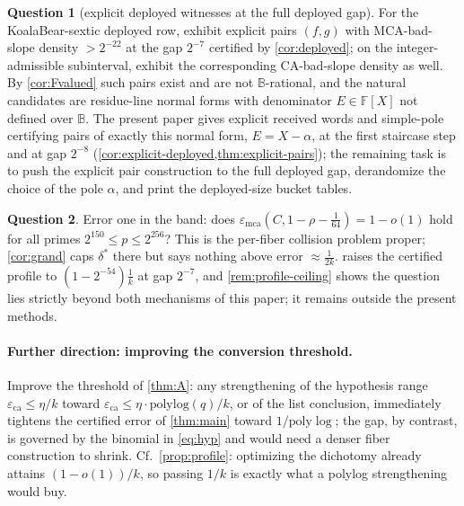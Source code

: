 \documentclass[11pt]{article}
\theoremstyle{definition}
\newtheorem{researchquestion}[researchquestion]{Question}
\theoremstyle{remark}
\newcommand{\F}{\mathbb{F}}
\newcommand{\B}{\mathbb{B}}
\newcommand{\eca}{\varepsilon_{\mathrm{ca}}}
\newcommand{\emca}{\varepsilon_{\mathrm{mca}}}
\begin{document}
\begin{researchquestion}[explicit deployed witnesses at the full deployed gap]\label{prob:explicit}
For the KoalaBear-sextic deployed row, exhibit explicit pairs $(f,g)$ with MCA-bad-slope density $>2^{-22}$ at the gap $2^{-7}$ certified by \cref{cor:deployed}; on the integer-admissible subinterval, exhibit the corresponding CA-bad-slope density as well.  By \cref{cor:Fvalued} such pairs exist and are not $\B$-rational, and the natural candidates are residue-line normal forms with denominator $E\in\F[X]$ not defined over $\B$.  The present paper gives explicit received words and simple-pole certifying pairs of exactly this normal form, $E=X-\alpha$, at the first staircase step and at gap $2^{-8}$ \textup(\cref{cor:explicit-deployed,thm:explicit-pairs}\textup); the remaining task is to push the explicit pair construction to the full deployed gap, derandomize the choice of the pole $\alpha$, and print the deployed-size bucket tables.
\end{researchquestion}

\begin{researchquestion}\label{prob:errorone}
Error one in the band: does $\emca(C,1-\rho-\frac1{64})=1-o(1)$ hold for all primes $2^{150}\le p\le2^{256}$? This is the per-fiber collision problem proper; \cref{cor:grand} caps $\delta^*$ there but says nothing above error $\approx\frac1{2k}$.   raises the certified profile to $(1-2^{-54})\frac1k$ at gap $2^{-7}$, and \cref{rem:profile-ceiling} shows the question lies strictly beyond both mechanisms of this paper; it remains outside the present methods.
\end{researchquestion}

\paragraph{Further direction: improving the conversion threshold.}\label{ques:conversion-threshold}
Improve the threshold of \cref{thm:A}: any strengthening of the hypothesis range $\eca\le\eta/k$ toward $\eca\le\eta\cdot\mathrm{polylog}(q)/k$, or of the list conclusion, immediately tightens the certified error of \cref{thm:main} toward $1/\mathrm{poly}\log$; the gap, by contrast, is governed by the binomial in \eqref{eq:hyp} and would need a denser fiber construction to shrink.  Cf.\ \cref{prop:profile}: optimizing the dichotomy already attains $(1-o(1))/k$, so passing $1/k$ is exactly what a polylog strengthening would buy.
\end{document}
